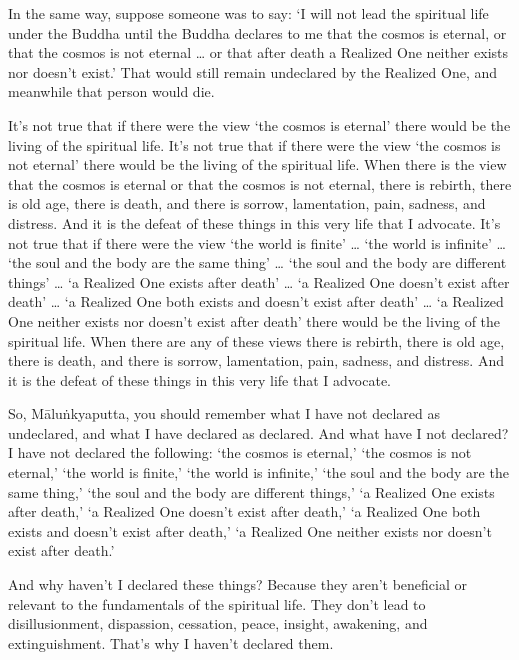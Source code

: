 \documentclass[12pt,openany]{book}%
\begin{document}
In the same way, suppose someone was to say: ‘I will not lead the spiritual life under the Buddha until the Buddha declares to me that the cosmos is eternal, or that the cosmos is not eternal … or that after death a Realized One neither exists nor doesn’t exist.’ That would still remain undeclared by the Realized One, and meanwhile that person would die. 

It’s not true that if there were the view ‘the cosmos is eternal’ there would be the living of the spiritual life. It’s not true that if there were the view ‘the cosmos is not eternal’ there would be the living of the spiritual life. When there is the view that the cosmos is eternal or that the cosmos is not eternal, there is rebirth, there is old age, there is death, and there is sorrow, lamentation, pain, sadness, and distress. And it is the defeat of these things in this very life that I advocate. It’s not true that if there were the view ‘the world is finite’ … ‘the world is infinite’ … ‘the soul and the body are the same thing’ … ‘the soul and the body are different things’ … ‘a Realized One exists after death’ … ‘a Realized One doesn’t exist after death’ … ‘a Realized One both exists and doesn’t exist after death’ … ‘a Realized One neither exists nor doesn’t exist after death’ there would be the living of the spiritual life. When there are any of these views there is rebirth, there is old age, there is death, and there is sorrow, lamentation, pain, sadness, and distress. And it is the defeat of these things in this very life that I advocate. 

So, \textsanskrit{Māluṅkyaputta}, you should remember what I have not declared as undeclared, and what I have declared as declared. And what have I not declared? I have not declared the following: ‘the cosmos is eternal,’ ‘the cosmos is not eternal,’ ‘the world is finite,’ ‘the world is infinite,’ ‘the soul and the body are the same thing,’ ‘the soul and the body are different things,’ ‘a Realized One exists after death,’ ‘a Realized One doesn’t exist after death,’ ‘a Realized One both exists and doesn’t exist after death,’ ‘a Realized One neither exists nor doesn’t exist after death.’ 

And why haven’t I declared these things? Because they aren’t beneficial or relevant to the fundamentals of the spiritual life. They don’t lead to disillusionment, dispassion, cessation, peace, insight, awakening, and extinguishment. That’s why I haven’t declared them. 
\end{document}
